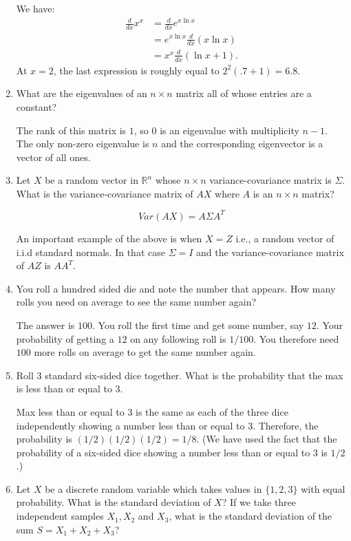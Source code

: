 \documentclass{amsart}
\theoremstyle{plain}
\numberwithin{equation}{section}
\begin{document}
\begin{enumerate}
We have:
\begin{align*}
\frac{d}{dx}x^x &= \frac{d}{dx} e^{ x\ln x} \\
&= e^{x \ln x }\frac{d}{dx}(x \ln x)\\
&= x^{x}\frac{d}{dx}(\ln x + 1 ).
\end{align*}
At $x=2$, the last expression is roughly equal to
$2^2(.7 + 1 )=6.8$.
\item What are the eigenvalues of an $n \times n$
 matrix all of whose entries are a constant?

The rank of this matrix is $1$, so $0$ is an eigenvalue
with multiplicity $n-1$. The only non-zero eigenvalue
is $n$ and the corresponding eigenvector is 
a vector of all ones. 

\item Let $X$ be a random vector in $\mathbb{R}^n$ whose
$n \times n$ variance-covariance 
matrix is $\Sigma$. What is the variance-covariance matrix of 
$AX$ where $A$ is an $n \times n$ matrix?

\begin{equation*}
Var(AX) = A \Sigma A^{T}
\end{equation*}

An important example of the above is when $X=Z$ i.e.,
a random vector of i.i.d standard normals. In that case
$\Sigma = I$ and the variance-covariance matrix 
of $AZ$ is $AA^T$.

\item You roll a hundred sided die and note the number 
that appears. How many rolls you need on average 
to see the same number again?

The answer is $100$. You roll the first time and get 
some number, say $12$. Your probability of getting a $12$
on any following roll is $1/100$. You therefore need
$100$ more rolls on average to get the same number again. 

\item Roll $3$ standard six-sided dice together. What is the 
probability that the max is less than or equal to $3$.

Max less than or equal to $3$ is the same as each of the 
three dice independently showing a number less than or equal to $3$. 
Therefore, the probability is $(1/2)(1/2)(1/2) = 1/8$. (We have used the fact
that the probability of a six-sided dice showing a 
number less than or equal to $3$ is $1/2$.)

\item Let $X$ be a discrete random variable which
takes values in $\lbrace 1, 2, 3 \rbrace$ with 
equal probability. What is the standard deviation of $X$?
If we take three independent samples $X_1, X_2$ and 
$X_3$, what is the standard deviation of the sum 
$S = X_1 + X_2 + X_3$?


\end{enumerate}
\end{document}
